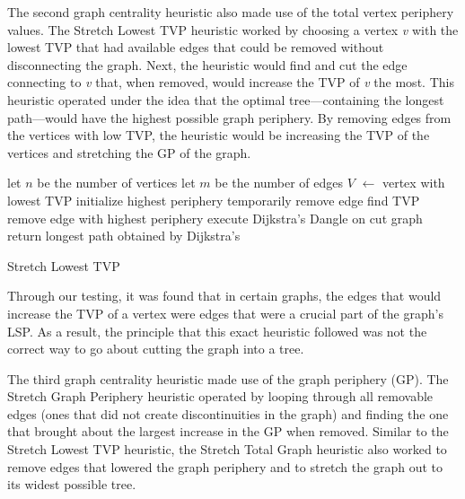 \documentclass[twocolumn,showpacs,%
  nofootinbib,aps,superscriptaddress,%
  eqsecnum,prd,notitlepage,showkeys,11pt]{article}
\begin{document}
The second graph centrality heuristic also made use of the total vertex periphery values. The Stretch Lowest TVP heuristic worked by choosing a vertex \textit{v} with the lowest TVP that had available edges that could be removed without disconnecting the graph. Next, the heuristic would find and cut the edge connecting to \textit{v} that, when removed, would increase the TVP of \textit{v} the most. This heuristic operated under the idea that the optimal tree---containing the longest path---would have the highest possible graph periphery. By removing edges from the vertices with low TVP, the heuristic would be increasing the TVP of the vertices and stretching the GP of the graph.

\begin{algorithm}
\begin{algorithmic}

\State let $n$ be the number of vertices 
\State let $m$ be the number of edges
\State{}
    \State $V$ $\gets$ vertex with lowest TVP
    \State initialize highest periphery
        \State temporarily remove edge
        \State find TVP
        \EndIf
    \State remove edge with highest periphery
    \EndFor
\EndFor
\State{}
\State execute Dijkstra's Dangle on cut graph
\State return longest path obtained by Dijkstra's
\end{algorithmic}
\caption{Stretch Lowest TVP}\label{alg:StretchLowestTVP}
\end{algorithm}

Through our testing, it was found that in certain graphs, the edges that would increase the TVP of a vertex were edges that were a crucial part of the graph's LSP. As a result, the principle that this exact heuristic followed was not the correct way to go about cutting the graph into a tree.

The third graph centrality heuristic made use of the graph periphery (GP). The Stretch Graph Periphery heuristic operated by looping through all removable edges (ones that did not create discontinuities in the graph) and finding the one that brought about the largest increase in the GP when removed. Similar to the Stretch Lowest TVP heuristic, the Stretch Total Graph heuristic also worked to remove edges that lowered the graph periphery and to stretch the graph out to its widest possible tree. 
\end{document}
